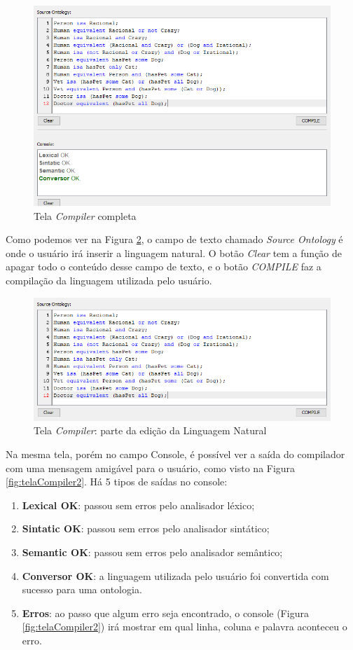 \documentclass{bcc}
\begin{document}
\begin{figure}[H]
\centering
\includegraphics[width=.7\textwidth]{Figuras/tela_compiler.png}
\caption{Tela \textit{Compiler} completa}
\label{fig:telaCompiler}
\end{figure}

Como podemos ver na Figura \ref{fig:telaCompiler1}, o campo de texto chamado \textit{Source Ontology} é onde o usuário irá inserir a linguagem natural. O botão \textit{Clear} tem a função de apagar todo o conteúdo desse campo de texto, e o botão \textit{COMPILE} faz a compilação da linguagem utilizada pelo usuário. 

\begin{figure}[H]
\centering
\includegraphics[width=.7\textwidth]{Figuras/tela_compiler1.png}
\caption{Tela \textit{Compiler}: parte da edição da Linguagem Natural}
\label{fig:telaCompiler1}
\end{figure}

Na mesma tela, porém no campo Console, é possível ver a saída do compilador com uma mensagem amigável para o usuário, como visto na Figura \ref{fig:telaCompiler2}. Há 5 tipos de saídas no console: 

\begin{enumerate}
  \item \textbf{Lexical OK}: passou sem erros pelo analisador léxico;
  \item \textbf{Sintatic OK}: passou sem erros pelo analisador sintático;
  \item \textbf{Semantic OK}: passou sem erros pelo analisador semântico;
  \item \textbf{Conversor OK}: a linguagem utilizada pelo usuário foi convertida com sucesso para uma ontologia.
  \item \textbf{Erros}: ao passo que algum erro seja encontrado, o console (Figura \ref{fig:telaCompiler2}) irá mostrar em qual linha, coluna e palavra aconteceu o erro.
\end{enumerate}
\end{document}

